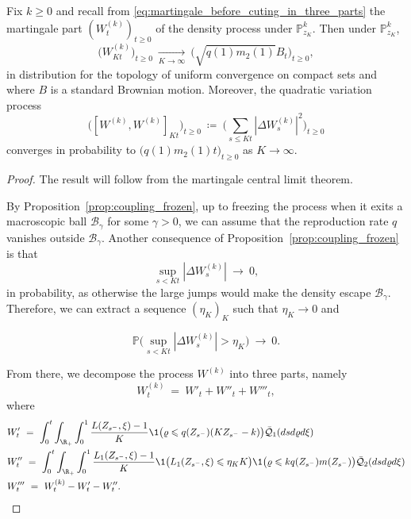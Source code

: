 \begin{refsegment}
\begin{lem}\label{lem:cv_martingale_jacod_shiryaev}
Fix $k\geqslant 0$ and recall from \eqref{eq:martingale_before_cuting_in_three_parts} the martingale part $(W^{(k)}_t)_{t\geqslant 0}$ of the density process under $\mathbb{P}^k_{z_K}$. 
   Then under $\mathbb{P}^k_{z_K}$, 
   \[
   \big(W^{(k)}_{Kt}\big)_{t\geqslant 0}\ \underset{K\to\infty}{\longrightarrow}\ \big(\sqrt{q(1)m_2(1)}B_t\big)_{t\geqslant 0},
   \]
   in distribution for the topology of uniform convergence on compact sets and where $B$ is a standard Brownian motion. Moreover, the quadratic variation process 
   \[
   \big([W^{(k)},W^{(k)}]_{Kt}\big)_{t\geqslant 0}\ \coloneqq\ \Big(\sum_{s\leqslant Kt}|\Delta W^{(k)}_s|^2\Big)_{t\geqslant 0}
   \] 
   converges in probability to $\big( q(1)m_2(1)t\big)_{t\geqslant 0}$ as $K\to\infty$. 
\end{lem}

\begin{proof}
The result will follow from the martingale central limit theorem.

By Proposition~\ref{prop:coupling_frozen}, up to freezing the process when it exits a macroscopic ball $\mathscr{B}_{\gamma}$ for some $\gamma > 0$, we can assume that the reproduction rate $q$ vanishes outside $\mathscr{B}_{\gamma}$. Another consequence of Proposition~\ref{prop:coupling_frozen} is that  
\[
\sup_{s < Kt} |\Delta W^{(k)}_s| \ \to \ 0,
\]
 in probability, as otherwise the large jumps would make the density escape $\mathscr{B}_{\gamma}$.  Therefore, we can extract a sequence $(\eta_K)_K$ such that $\eta_K\to 0$ and 

 \[
\mathbb{P}\big(\sup_{s < Kt} |\Delta W^{(k)}_s| >  \eta_K\big)\ \to \ 0.
\]

From there, we decompose the 
process $W^{(k)}$ into three
parts, namely
\[
   W^{(k)}_t\ =\ W'_t+W''_t+ W'''_t, 
\]
where
\begin{align*}
   & W'_t\ =\ \int_0^t \int_{\R_+} \int_0^1 \frac{L(Z_{s^-},\xi)-1}{K}\1\big(\varrho \leqslant q({Z}_{s^-})(K{Z}_{s^-}-k)\big)\bar{\mathcal{Q}}_1( ds d\varrho d\xi)\\
   & W''_t\ =\ \int_0^t \int_{\R_+} \int_0^1 \frac{L_1(Z_{s^-},\xi)-1}{K}\1\big( L_1(Z_{s^-},\xi) \leqslant \eta_K K\big)\1\big(\varrho \leqslant k q({Z}_{s^-}) m({Z}_{s^-})\big)  \bar{\mathcal{Q}}_2( ds d\varrho d\xi) \\
   & W'''_t\ =\ W^{(k)}_t-W'_t-W''_t.
\end{align*}


\end{proof}
\end{refsegment}
